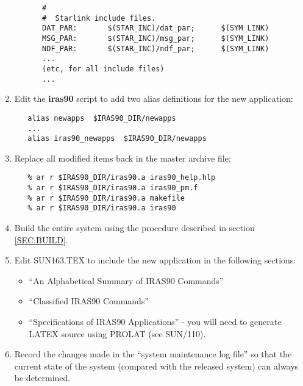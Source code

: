\begin{enumerate}
\begin{itemize}
\small 
\begin{verbatim}
   #
   #  Starlink include files.
   DAT_PAR:       $(STAR_INC)/dat_par;      $(SYM_LINK)
   MSG_PAR:       $(STAR_INC)/msg_par;      $(SYM_LINK)
   NDF_PAR:       $(STAR_INC)/ndf_par;      $(SYM_LINK)
   ...
   (etc, for all include files)
   ...
\end{verbatim}
\normalsize

\end{itemize}

\item Edit the {\bf iras90} script to add two alias definitions for the new 
application:

\small
\begin{verbatim}
   alias newapps  $IRAS90_DIR/newapps
   ...
   alias iras90_newapps  $IRAS90_DIR/newapps
\end{verbatim}
\normalsize

\item Replace all modified items back in the master archive file:

\small
\begin{verbatim}
   % ar r $IRAS90_DIR/iras90.a iras90_help.hlp
   % ar r $IRAS90_DIR/iras90.a iras90_pm.f
   % ar r $IRAS90_DIR/iras90.a makefile
   % ar r $IRAS90_DIR/iras90.a iras90
\end{verbatim}
\normalsize

\item Build the entire system using the procedure described in section 
\ref{SEC:BUILD}.

\item Edit {\small SUN163.TEX} to include the new application in the following 
sections:
\begin{itemize}
\item ``An Alphabetical Summary of {\small IRAS90} Commands''
\item ``Classified {\small IRAS90} Commands''
\item ``Specifications of {\small IRAS90} Applications'' - you will need to 
generate {\small LATEX} source using {\small PROLAT} (see SUN/110).
\end{itemize}

\item Record the changes made in the ``system maintenance log file'' so that the
current state of the system (compared with the released system) can 
always be determined.

\end{enumerate}

